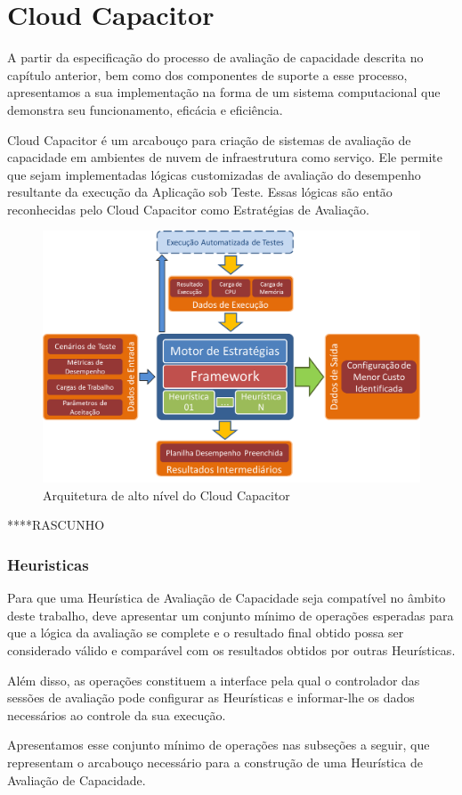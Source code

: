 \chapter[Cloud Capacitor]{Cloud Capacitor}
A partir da especificação do processo de avaliação de capacidade descrita no
capítulo anterior, bem como dos componentes de suporte a esse processo, apresentamos
a sua implementação na forma de um sistema computacional que demonstra seu funcionamento,
eficácia e eficiência.

Cloud Capacitor é um arcabouço para criação de sistemas de avaliação de 
capacidade em ambientes de nuvem de infraestrutura como serviço. Ele permite que 
sejam implementadas lógicas customizadas de avaliação do desempenho resultante
da execução da Aplicação sob Teste. Essas lógicas são então reconhecidas pelo Cloud 
Capacitor como Estratégias de Avaliação.

\begin{figure}[htb]
  \caption{\label{fig_arq_alto_nivel}Arquitetura de alto nível do Cloud Capacitor}
  \begin{center}
    \includegraphics[scale=0.5]{img/arquiteturaAltoNivel}
  \end{center}
\end{figure}

****RASCUNHO
\subsection{Heuristicas}
Para que uma Heurística de Avaliação de Capacidade seja compatível no âmbito deste trabalho, 
deve apresentar um conjunto mínimo de operações esperadas para que a lógica da
avaliação se complete e o resultado final obtido possa ser considerado válido e
comparável com os resultados obtidos por outras Heurísticas.

Além disso, as operações constituem a interface pela qual o controlador das 
sessões de avaliação pode configurar as Heurísticas e informar-lhe os dados 
necessários ao controle da sua execução.
 
Apresentamos esse conjunto mínimo de operações nas subseções a seguir, que 
representam o arcabouço necessário para a construção de uma Heurística de 
Avaliação de Capacidade.
 
